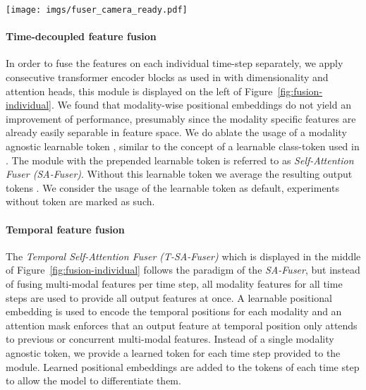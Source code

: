 \documentclass[10pt,twocolumn,letterpaper,dvipsnames]{article}
\begin{document}
\begin{figure*}[t]
\centering
  \texttt{[image: imgs/fuser\_camera\_ready.pdf]}
  \caption{The \emph{SA-Fuser} on the left applies Transformer Encoder blocks at individual time steps while the \emph{T-SA-Fuser} in the middle and the transformer decoder based \emph{CA-Fuser} on the right perform fusion on the whole temporal sequence at once.}
  \label{fig:fusion-individual}
\end{figure*}

\paragraph{Time-decoupled feature fusion}
\label{sec:cmtfuser}
In order to fuse the features  on each individual time-step  separately, we apply  consecutive transformer encoder blocks as used in \cite{dosovitskiyImageWorth16x162021} with dimensionality  and  attention heads, this module is displayed on the left of Figure~\ref{fig:fusion-individual}.  We found that modality-wise positional embeddings do not yield an improvement of performance, presumably since the modality specific features are already easily separable in feature space. We do ablate the usage of a modality agnostic learnable token , similar to the concept of a learnable class-token used in \cite{dosovitskiyImageWorth16x162021}. The module with the prepended learnable token  is referred to as \emph{Self-Attention Fuser (SA-Fuser)}. Without this learnable token we average the resulting output tokens . We consider the usage of the learnable token as default, experiments without token are marked as such.

\paragraph{Temporal feature fusion}
\label{sec:t-cmtfuser}
The \emph{Temporal Self-Attention Fuser (T-SA-Fuser)} which is displayed in the middle of Figure~\ref{fig:fusion-individual} follows the paradigm of the \emph{SA-Fuser}, but instead of fusing multi-modal features per time step, all modality features for all time steps are used to provide all output features  at once. A learnable positional embedding  is used to encode the temporal positions for each modality and an attention mask enforces that an output feature at temporal position  only attends to previous or concurrent multi-modal features. Instead of a single modality agnostic token, we provide a learned token for each time step provided to the module. Learned positional embeddings are added to the tokens of each time step to allow the model to differentiate them.
\end{document}
